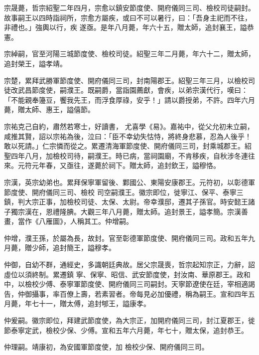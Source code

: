 \begin{pinyinscope}
 宗晟薨，哲宗紹聖二年四月，宗愈以鎮安節度使、開府儀同三司、檢校司徒嗣封。故事嗣王以四時詣祠所，宗愈方屬疾，或曰不可以暑行，曰：「吾身主祀而不往，非禮也。」強輿以行，疾
 遂亟。是年八月薨，年六十五，贈太師，追封襄王，謚恭憲。



 宗綽嗣，官至河陽三城節度使、檢校司徒。紹聖三年二月薨，年六十二，贈太師，追封榮王，謚孝靖。



 宗楚，累拜武勝軍節度使、開府儀同三司，封南陽郡王。紹聖三年三月，以檢校司徒改武昌節度使，嗣濮王。既嗣爵，當詣園薦獻，會疾，以弟宗漢代行，嘆曰：「不能親奉籩豆，饗我先王，而浮食厚祿，安乎！」請以爵授弟，不許。四年六月薨，贈太師、惠王，謚僖節。



 宗祐克己自約，肅然若寒士，好讀書，
 尤喜學《易》。嘉祐中，從父允初未立嗣，咸推其賢，詔以宗祐為後，泣曰：「臣不幸幼失怙恃，將終身悲慕，忍為人後乎！敢以死請。」仁宗憐而從之。累遷清海軍節度使、開府儀同三司，封乘城郡王。紹聖四年八月，加檢校司待，嗣濮王。時已病，當祠園廟，不肯移疾，自秋涉冬連往來。元符元年春，又亟往，遂薨於祠下。贈太師，追封欽王，謚穆恪。



 宗漢，英宗幼弟也。累拜保寧軍留後、鄴國公、東陽安康郡王。元符初，以彰德軍節度使、開府儀同三司、檢校
 司空嗣濮王。徽宗即位，徙寧江、保平、泰寧三鎮，判大宗正事，加檢校司徒、太保、太尉。帝幸濮邸，遷其子孫官。時安懿王諸子獨宗漢在，恩禮隆腆。大觀三年八月薨，贈太師。追封景王，謚孝簡。宗漢善畫，當作《八雁圖》，人稱其工。仲增嗣。



 仲增，濮王孫，於屬為長，故封。官至彰德軍節度使、開府儀同三司。政和五年九月薨，贈少師，追封簡王，謚穆孝。



 仲御，自幼不群，通經史，多識朝廷典故。居父宗晟喪，哲宗起知宗正，力辭，詔虛位以須終制。累遷鎮
 寧、保寧、昭信、武安節度使，封汝南、華原郡王。政和中，以檢校少傅、泰寧軍節度使、開府儀同三司嗣封。天寧節遼使在廷，宰相適謁告，仲御攝事，率百僚上壽，若素習者。帝每見必加優禮，稱為嗣王。宣和四年五月薨，年七十一，贈太傅，追封郇王，謚康孝。



 仲爰嗣。徽宗即位，拜建武節度使，為大宗正，加開府儀同三司，封江夏郡王，徙節泰寧定武，檢校少保、少傅。宣和五年六月薨，年七十，贈太保，追封恭王。



 仲理嗣。靖康初，為安國軍節度使，加
 檢校少保、開府儀同三司。




\end{pinyinscope}

